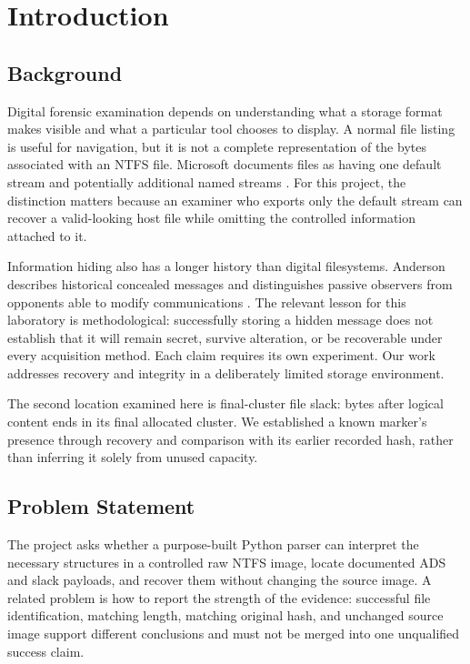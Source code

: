 \chapter{Introduction}
\section{Background}
Digital forensic examination depends on understanding what a storage format
makes visible and what a particular tool chooses to display. A normal file
listing is useful for navigation, but it is not a complete representation of
the bytes associated with an NTFS file. Microsoft documents files as having
one default stream and potentially additional named streams \cite{streams,clusters}.
For this project, the distinction matters because an examiner who exports
only the default stream can recover a valid-looking host file while omitting
the controlled information attached to it.

Information hiding also has a longer history than digital filesystems.
Anderson describes historical concealed messages and distinguishes passive
observers from opponents able to modify communications \cite{anderson}.
The relevant lesson for this laboratory is methodological: successfully
storing a hidden message does not establish that it will remain secret,
survive alteration, or be recoverable under every acquisition method. Each
claim requires its own experiment. Our work addresses recovery and integrity
in a deliberately limited storage environment.

The second location examined here is final-cluster file slack: bytes after
logical content ends in its final allocated cluster. We established a known
marker's presence through recovery and comparison with its earlier recorded
hash, rather than inferring it solely from unused capacity.

\section{Problem Statement}
The project asks whether a purpose-built Python parser can interpret the
necessary structures in a controlled raw NTFS image, locate documented ADS
and slack payloads, and recover them without changing the source image.
A related problem is how to report the strength of the evidence: successful
file identification, matching length, matching original hash, and unchanged
source image support different conclusions and must not be merged into one
unqualified success claim.

